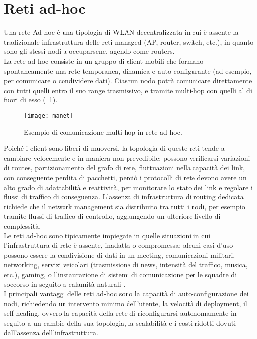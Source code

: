 \section[Reti ad-hoc]{Reti ad-hoc}
Una rete Ad-hoc è una tipologia di WLAN decentralizzata in cui è assente la tradizionale infrastruttura delle reti managed (AP, router, switch, etc.), in quanto sono gli stessi nodi a occuparsene, agendo come routers. \\
La rete ad-hoc consiste in un gruppo di client mobili che formano spontaneamente una rete temporanea, dinamica e auto-configurante (ad esempio, per comunicare o condividere dati). 
Ciascun nodo potrà comunicare direttamente con tutti quelli entro il suo range trasmissivo, e tramite multi-hop con quelli al di fuori di esso (\figurename\ \ref{fig:manet}). \\
%
\begin{figure}
	\begin{center}
		\texttt{[image: manet]}
	\end{center}
	\caption{Esempio di comunicazione multi-hop in rete ad-hoc.} \label{fig:manet}
\end{figure}
%
Poiché i client sono liberi di muoversi, la topologia di queste reti tende a cambiare velocemente e in maniera non prevedibile: possono verificarsi variazioni di routes, partizionamento del grafo di rete, fluttuazioni nella capacità dei link, con conseguente perdita di pacchetti, perciò i protocolli di rete devono avere un alto grado di adattabilità e reattività, per  monitorare lo stato dei link e regolare i flussi di traffico di conseguenza.
L'assenza di infrastruttura di routing dedicata richiede che il network management sia distribuito tra tutti i nodi, per esempio tramite flussi di traffico di controllo, aggiungendo un ulteriore livello di complessità. \\
Le reti ad-hoc sono tipicamente impiegate in quelle situazioni in cui l'infrastruttura di rete è assente, inadatta o compromessa: alcuni casi d'uso possono essere la condivisione di dati in un meeting, comunicazioni militari, networking, servizi veicolari (trasmissione di news, intensità del traffico, musica, etc.), gaming, o l'instaurazione di sistemi di comunicazione per le squadre di soccorso in seguito a calamità naturali \cite{7402025}. \\
I principali vantaggi delle reti ad-hoc sono la capacità di auto-configurazione dei nodi, richiedendo un intervento minimo dell'utente, la velocità di deployment, il self-healing, ovvero la capacità della rete di riconfigurarsi autonomamente in seguito a un cambio della sua topologia, la scalabilità e i costi ridotti dovuti dall'assenza dell'infrastruttura.\\
